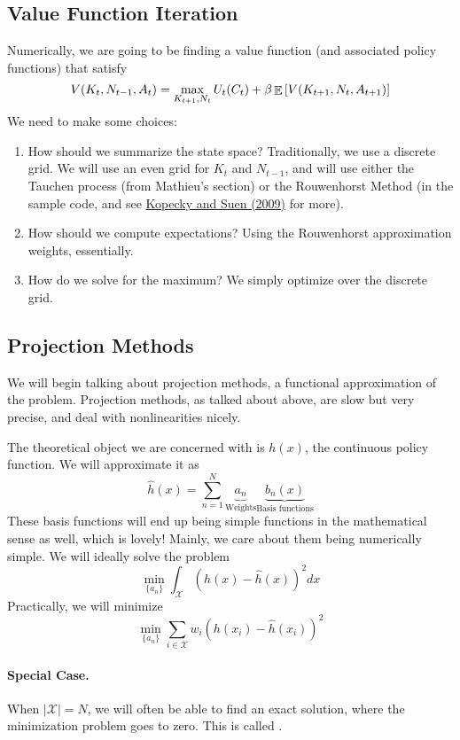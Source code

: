 \documentclass[10pt]{article}
\begin{document}
\subsection{Value Function Iteration}

Numerically, we are going to be finding a value function (and associated policy functions) that satisfy 
\[
V(K_t,N_{t-1},A_t) = \max_{K_{t+1},N_t} U_t(C_t) + \beta \mathop{\mathbb{E}} \left[ V(K_{t+1},N_t,A_{t+1}) \right]
\]
We need to make some choices:
\begin{enumerate}
\item How should we summarize the state space? Traditionally, we use a discrete grid. We will use an even grid for $K_t$ and $N_{t-1}$, and will use either the Tauchen process (from Mathieu's section) or the Rouwenhorst Method (in the sample code, and see \href{https://karenkopecky.net/Rouwenhorst_WP.pdf}{Kopecky and Suen (2009)} for more).

\item How should we compute expectations? Using the Rouwenhorst approximation weights, essentially.

\item How do we solve for the maximum? We simply optimize over the discrete grid.
\end{enumerate}


\subsection{Projection Methods}

We will begin talking about projection methods, a functional approximation of the problem. Projection methods, as talked about above, are slow but very precise, and deal with nonlinearities nicely. 

The theoretical object we are concerned with is $h(x)$, the continuous policy function. We will approximate it as 
\[
\hat{h}(x) = \sum_{n=1}^N \underbrace{a_n}_{\text{Weights}} \underbrace{b_n(x)}_{\text{Basis functions}}
\]
These basis functions will end up being simple functions in the mathematical sense as well, which is lovely! Mainly, we care about them being numerically simple. We will ideally solve the problem
\[
\min_{\{a_n\}} \int_\mathcal{X} (h(x) - \hat{h}(x))^2 dx
\]
Practically, we will minimize
\[
\min_{\{a_n\}} \sum_{i\in \mathcal{X}} w_i(h(x_i) - \hat{h}(x_i))^2
\]

\paragraph{Special Case.} When $|\mathcal{X}| = N$, we will often be able to find an exact solution, where the minimization problem goes to zero. This is called .
\end{document}
